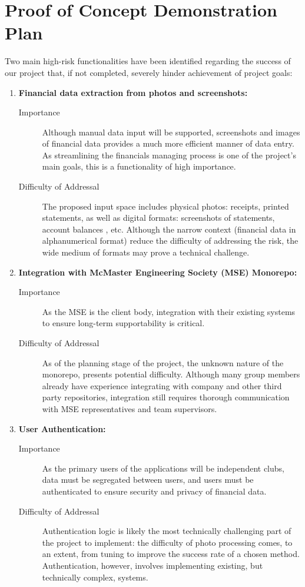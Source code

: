 \documentclass{article}
\begin{document}
\section{Proof of Concept Demonstration Plan}
Two main high-risk functionalities have been identified regarding the success of our project that, if not completed, severely hinder achievement of project goals:
\begin {enumerate}
  \item \textbf{Financial data extraction from photos and screenshots:}
    \begin {description} 
      \item[Importance] Although manual data input will be supported, screenshots and images of financial data provides 
 a much more efficient manner of data entry. As streamlining the financials managing process is one of the project's main goals, this is a functionality of high importance. 
      \item[Difficulty of Addressal] The proposed input space includes physical photos: receipts, printed statements, as well as digital formats: screenshots of statements, account balances
    , etc. Although the narrow context (financial data in alphanumerical format) reduce the difficulty of addressing the risk, the wide medium of formats may prove a technical challenge.
    \end {description}
  \item \textbf{Integration with McMaster Engineering Society (MSE) Monorepo:}
    \begin {description} 
      \item[Importance] As the MSE is the client body, integration with their existing systems to ensure long-term supportability is critical.
      \item[Difficulty of Addressal] As of the planning stage of the project, the unknown nature of the monorepo, presents potential difficulty.
      Although many group members already have experience integrating with company and other third party repositories, integration still requires 
      thorough communication with MSE representatives and team supervisors.
    \end {description}
  \item \textbf{User Authentication:}
    \begin {description} 
      \item[Importance] As the primary users of the applications will be independent clubs, data must be segregated between users, and users must be authenticated
      to ensure security and privacy of financial data.
      \item[Difficulty of Addressal] Authentication logic is likely the most technically challenging part of the project to implement: the difficulty of photo processing comes, to an extent,
      from tuning to improve the success rate of a chosen method. Authentication, however, involves implementing existing, but technically complex, systems.
    \end {description}
\end {enumerate}
\end{document}
